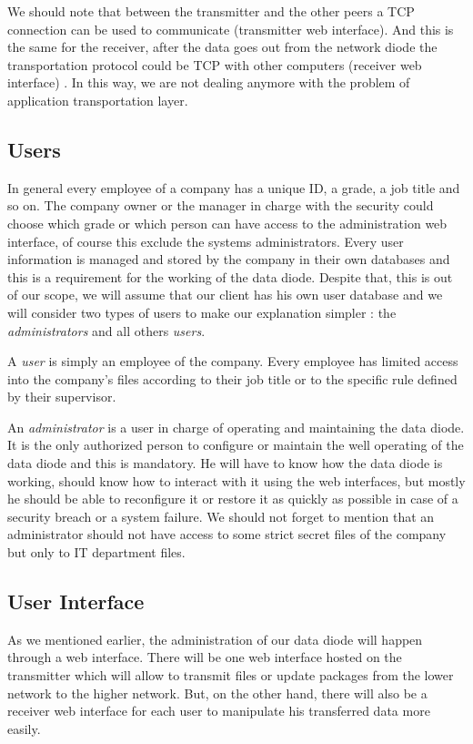 \documentclass[a4paper,10pt]{article}
\begin{document}
We should note that between the transmitter and the other peers a TCP connection can be used to communicate (transmitter web interface). And this is the same for the receiver, after the data goes out from the network diode the transportation protocol could be TCP with other computers (receiver web interface) . In this way, we are not dealing anymore with the problem of application transportation layer. 

\subsection{Users} 
In general every employee of a company has a unique ID, a grade, a job title and so on. The company owner or the manager in charge with the security could choose which grade or which person can have access to the administration web interface, of course this exclude the systems administrators. Every user information is managed and stored by the company in their own databases and this is a requirement for the working of the data diode. Despite that, this is out of our scope, we will assume that our client has his own user database and we will consider two types of users to make our explanation simpler : the \textit{administrators} and all others \textit{users}.

A \textit{user} is simply an employee of the company. Every employee has limited access into the company's files according to their job title or to the specific rule defined by their supervisor.

An \textit{administrator} is a user in charge of operating and maintaining the data diode. It is the only authorized person to configure or maintain the well operating of the data diode and this is mandatory. He will have to know how the data diode is working, should know how to interact with it using the web interfaces, but mostly he should be able to reconfigure it or restore it as quickly as possible in case of a security breach or a system failure. We should not forget to mention that an administrator should not have access to some strict secret files of the company but only to IT department files.


\subsection{User Interface}

As we mentioned earlier, the administration of our data diode will happen through a web interface. There will be one web interface hosted on the transmitter which will allow to transmit files or update packages from the lower network to the higher network. But, on the other hand, there will also be a receiver web interface for each user to manipulate his transferred data more easily.
\end{document}
